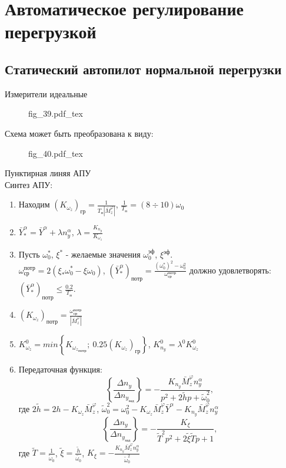 \documentclass{article}
\begin{document}
\section{Автоматическое регулирование перегрузкой}
\subsection{Статический автопилот нормальной перегрузки}
Измерители идеальные
\begin{figure}[H]
	\centering
	{fig_39.pdf_tex}
\end{figure}

Схема может быть преобразована к виду:

\begin{figure}[H]
	\centering
	{fig_40.pdf_tex}
\end{figure}

Пунктирная линяя АПУ\\
Синтез АПУ:
\begin{enumerate}
	\item Находим $(K_{\omega_z})_\text{гр} =\frac{1}{T_\text{п}
		      |\bar{M}_z^{\varphi}|}$, $\frac{1}{T_\text{п}} = (8 \div 10)\omega_0$
	\item $\bar{Y}_*^\alpha =\bar{Y}^\alpha + \lambda n_y^\alpha$, $\lambda =
		      \frac{K_{n_y}}{K_{\omega_z}}$
	\item Пусть $\omega_0^*$, $\xi^*$ - желаемые значения
	      $\omega_0^{\text{эф}}$, $\xi^{\text{эф}}$.\\
	      $\omega_\text{ср}^\text{потр} = 2 (\xi_* \omega_0^* - \xi \omega_0)$,
	      $(\bar{Y}_*^\alpha)_\text{потр} = \frac{(\omega_0^*)^2 -
			      \omega_0^2}{\omega_\text{ср}^\text{потр}}$
	      должно удовлетворять: $(\bar{Y}_*^\alpha)_\text{потр} \leq
		      \frac{0.2}{T_\text{п}}$.
	\item $(K_{\omega_z})_\text{потр} =
		      \frac{\omega_\text{ср}^\text{потр}}{|\bar{M}_z^\varphi|}$
	\item $K_{\omega_z}^0 = min \left\{ K_{{\omega_z}_\text{потр}};\
		      0.25(K_{\omega_z})_\text{гр} \right\}$, $K_{n_y}^0 = \lambda^0
		      K_{\omega_z}^0$
	\item Передаточная функция:
	      \[
		      \left\{\frac{\Delta n_y}{\Delta n_{y_\text{зад}}} \right\}  =
		      -\frac{K_{n_y}\bar{M}_z^\varphi n_y^\alpha }{p^2 + 2 \tilde{h} p
			      + \tilde{\omega}_0^2},
	      \]
	      где $2 \tilde{h} = 2h - K_{\omega_z} \bar{M}_z^\varphi$,
	      $\tilde{\omega}^{2}_0= \omega_0^2 - K_{\omega_z} \bar{M}_z^\varphi
		      \bar{Y}^\alpha - K_{n_y} \bar{M}_z^\varphi n_y^\alpha$
	      \[
		      \left\{\frac{\Delta n_y}{\Delta n_{y_\text{зад}}} \right\} =
		      -\frac{K_{\xi}}{\tilde{T}^2 p^2 + 2 \tilde{\xi} \tilde{T}p + 1},
	      \]
	      где $\tilde{T} = \frac{1}{\tilde{\omega}_0}$, $\tilde{\xi}
		      =\frac{\tilde{h}}{\tilde{\omega_{0}}}$, $K_\xi = -\frac{K_{n_y}
			      \bar{M}_z^\varphi n_y^\alpha}{\tilde{\omega}_0^2}$
\end{enumerate}
\end{document}
